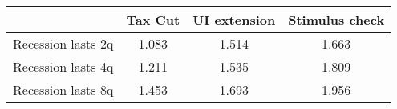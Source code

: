 \begin{tabular}{@{}lccc@{}} 
\toprule 
& Tax Cut    & UI extension    & Stimulus check    \\  \midrule 
Recession lasts 2q &1.083  & 1.514  & 1.663     \\ 
Recession lasts 4q &1.211  & 1.535  & 1.809     \\ 
Recession lasts 8q &1.453  & 1.693  & 1.956     \\ 
\end{tabular}  
